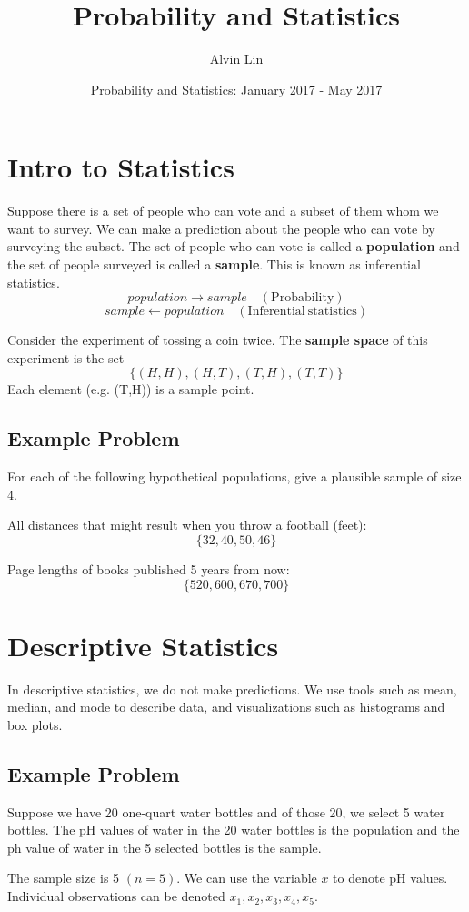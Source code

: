 \documentclass[letterpaper, 12pt]{math}
\title{Probability and Statistics}
\author{Alvin Lin}
\date{Probability and Statistics: January 2017 - May 2017}
\begin{document}
\maketitle

\section*{Intro to Statistics}
Suppose there is a set of people who can vote and a subset of them
whom we want to survey. We can make a prediction about the people
who can vote by surveying the subset. The set of people who can
vote is called a \textbf{population} and the set of people surveyed
is called a \textbf{sample}. This is known as inferential statistics.
\[ population \to sample \quad \mathrm{(Probability)} \]
\[ sample \gets population \quad \mathrm{(Inferential\ statistics)} \]

Consider the experiment of tossing a coin twice. The
\textbf{sample space} of this experiment is the set
\[ \bigg\{ (H,H), (H,T), (T,H), (T,T) \bigg\} \]
Each element (e.g. (T,H)) is a sample point.

\subsection*{Example Problem}
For each of the following hypothetical populations, give a plausible
sample of size 4.

All distances that might result when you throw a football (feet):
\[ \bigg\{ 32, 40, 50, 46 \bigg\} \]

Page lengths of books published 5 years from now:
\[ \bigg\{ 520, 600, 670, 700 \bigg\} \]

\section*{Descriptive Statistics}
In descriptive statistics, we do not make predictions. We use tools such
as mean, median, and mode to describe data, and visualizations such as
histograms and box plots.

\subsection*{Example Problem}
Suppose we have 20 one-quart water bottles and of those 20, we select 5
water bottles. The pH values of water in the 20 water bottles is the
population and the ph value of water in the 5 selected bottles is the sample.

The sample size is 5 \( (n = 5) \). We can use the variable \( x \) to denote
pH values. Individual observations can be denoted \( x_{1}, x_{2}, x_{3}, x_{4},
x_{5} \).
\end{document}
